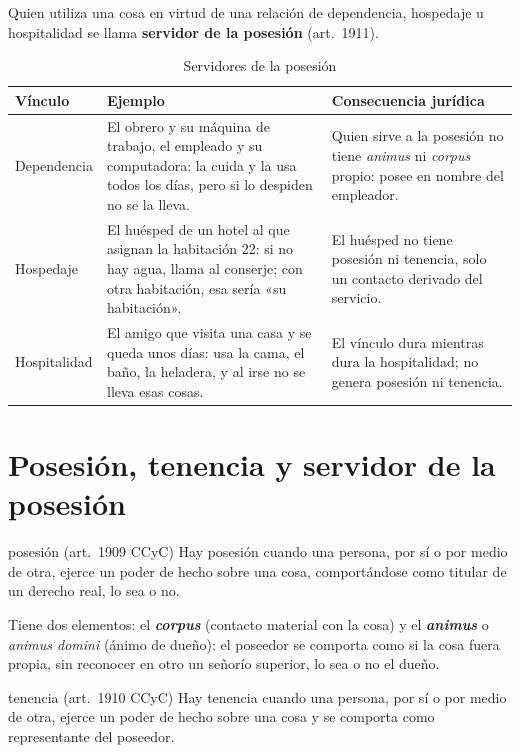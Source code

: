 \documentclass[12pt,oneside]{book}
\begin{document}
Quien utiliza una cosa en virtud de una relación de dependencia, hospedaje u hospitalidad se llama \textbf{servidor de la posesión} (art.~1911).

\begin{table}[H]
\centering
\small
\begin{tabularx}{\textwidth}{>{\raggedright\arraybackslash}p{}>{\raggedright\arraybackslash}X>{\raggedright\arraybackslash}X}
\toprule
\textbf{Vínculo} & \textbf{Ejemplo} & \textbf{Consecuencia jurídica} \\
\midrule
Dependencia & El obrero y su máquina de trabajo, el empleado y su computadora: la cuida y la usa todos los días, pero si lo despiden no se la lleva. & Quien sirve a la posesión no tiene \textit{animus} ni \textit{corpus} propio: posee en nombre del empleador. \\
Hospedaje & El huésped de un hotel al que asignan la habitación 22: si no hay agua, llama al conserje; con otra habitación, esa sería «su habitación». & El huésped no tiene posesión ni tenencia, solo un contacto derivado del servicio. \\
Hospitalidad & El amigo que visita una casa y se queda unos días: usa la cama, el baño, la heladera, y al irse no se lleva esas cosas. & El vínculo dura mientras dura la hospitalidad; no genera posesión ni tenencia. \\
\bottomrule
\end{tabularx}
\caption{Servidores de la posesión}
\end{table}

\section{Posesión, tenencia y servidor de la posesión}

\begin{definicion}{posesión (art.~1909 CCyC)}
Hay posesión cuando una persona, por sí o por medio de otra, ejerce un poder de hecho sobre una cosa, comportándose como titular de un derecho real, lo sea o no.
\end{definicion}

Tiene dos elementos: el \textbf{\textit{corpus}} (contacto material con la cosa) y el \textbf{\textit{animus}} o \textit{animus domini} (ánimo de dueño): el poseedor se comporta como si la cosa fuera propia, sin reconocer en otro un señorío superior, lo sea o no el dueño.

\begin{definicion}{tenencia (art.~1910 CCyC)}
Hay tenencia cuando una persona, por sí o por medio de otra, ejerce un poder de hecho sobre una cosa y se comporta como representante del poseedor.
\end{definicion}
\end{document}
